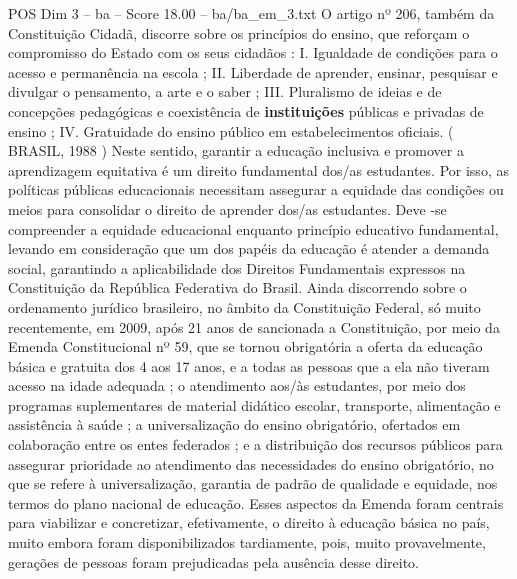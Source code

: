 \begin{textsample}{POS Dim 3 – ba – Score 18.00 – ba/ba\_em\_3.txt}
O artigo nº 206, também da Constituição Cidadã, discorre sobre os princípios do ensino, que reforçam o compromisso do Estado com os seus cidadãos : I.
Igualdade de condições para o acesso e permanência na escola ; II.
Liberdade de aprender, ensinar, pesquisar e divulgar o pensamento, a arte e o saber ; III.
Pluralismo de ideias e de concepções pedagógicas e coexistência de \textbf{instituições} públicas e privadas de ensino ; IV.
Gratuidade do ensino público em estabelecimentos oficiais. ( BRASIL, 1988 ) Neste sentido, garantir a educação inclusiva e promover a aprendizagem equitativa é um direito fundamental dos/as estudantes.
Por isso, as políticas públicas educacionais necessitam assegurar a equidade das condições ou meios para consolidar o direito de aprender dos/as estudantes.
Deve -se compreender a equidade educacional enquanto princípio educativo fundamental, levando em consideração que um dos papéis da educação é atender a demanda social, garantindo a aplicabilidade dos Direitos Fundamentais expressos na Constituição da República Federativa do Brasil.
Ainda discorrendo sobre o ordenamento jurídico brasileiro, no âmbito da Constituição Federal, só muito recentemente, em 2009, após 21 anos de sancionada a Constituição, por meio da Emenda Constitucional nº 59, que se tornou obrigatória a oferta da educação básica e gratuita dos 4 aos 17 anos, e a todas as pessoas que a ela não tiveram acesso na idade adequada ; o atendimento aos/às estudantes, por meio dos programas suplementares de material didático escolar, transporte, alimentação e assistência à saúde ; a universalização do ensino obrigatório, ofertados em colaboração entre os entes federados ; e a distribuição dos recursos públicos para assegurar prioridade ao atendimento das necessidades do ensino obrigatório, no que se refere à universalização, garantia de padrão de qualidade e equidade, nos termos do plano nacional de educação.
Esses aspectos da Emenda foram centrais para viabilizar e concretizar, efetivamente, o direito à educação básica no país, muito embora foram disponibilizados tardiamente, pois, muito provavelmente, gerações de pessoas foram prejudicadas pela ausência desse direito.

\end{textsample}
